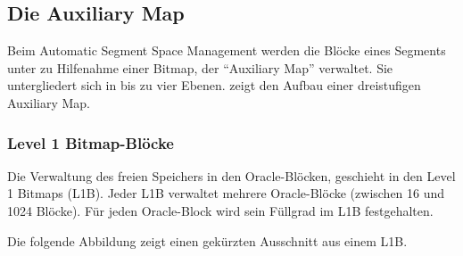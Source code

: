       \subsection{Die Auxiliary Map}
        Beim Automatic Segment Space Management werden die Bl\"ocke eines Segments unter zu Hilfenahme einer Bitmap, der \enquote{Auxiliary Map} verwaltet. Sie untergliedert sich in bis zu vier Ebenen.  zeigt den Aufbau einer dreistufigen Auxiliary Map.
        \subsubsection{Level 1 Bitmap-Bl\"ocke}
          Die Verwaltung des freien Speichers in den Oracle-Bl\"ocken, geschieht in den Level 1 Bitmaps (L1B). Jeder L1B verwaltet mehrere Oracle-Bl\"ocke (zwischen 16 und 1024 Bl\"ocke). F\"ur jeden Oracle-Block wird sein F\"ullgrad im L1B festgehalten.

          Die folgende Abbildung zeigt einen gek\"urzten Ausschnitt aus einem L1B.
\clearpage

